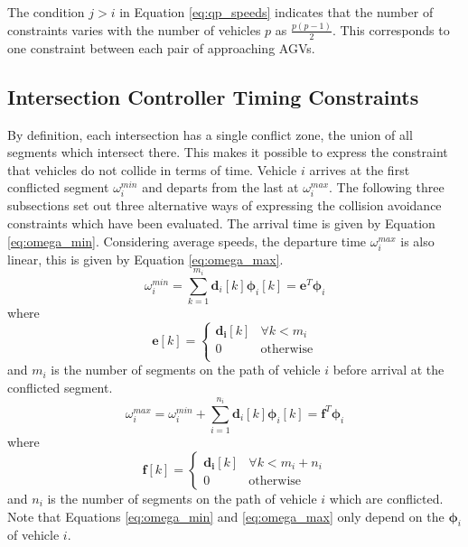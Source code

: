 \documentclass[]{article}
\begin{document}
The condition $j>i$ in Equation \ref{eq:qp_speeds} indicates that the number of constraints varies with the number of vehicles $p$ as $\frac{p(p-1)}{2}$. This corresponds to one constraint between each pair of approaching AGVs.

\subsection{Intersection Controller Timing Constraints}
By definition, each intersection has a single conflict zone, the union of all segments which intersect there. This makes it possible to express the constraint that vehicles do not collide in terms of time. Vehicle $i$ arrives at the first conflicted segment $\omega_i^{min}$ and departs from the last at $\omega_i^{max}$. The following three subsections set out three alternative ways of expressing the collision avoidance constraints which have been evaluated. 
The arrival time is given by Equation \ref{eq:omega_min}. Considering average speeds, the departure time $\omega_i^{max}$ is also linear, this is given by Equation \ref{eq:omega_max}. 
\begin{equation}
	\omega_i^{min}  = \sum_{k=1}^{m_i} \bm{d}_i [k] \bm{\phi}_i [k] = \bm{e}^T \bm{\phi}_i
	\label{eq:omega_min}
\end{equation}
where %
\begin{equation}
	\bm{e}[k] = \left\{
	\begin{array}{cc}
		\bm{d_i}[k] & \forall k <m_i \\
		0 & \textrm{otherwise} \\
	\end{array}
	\right.
\end{equation}  and $m_i$ is the number of segments on the path of vehicle $i$ before arrival at the conflicted segment. 
\begin{equation}
	\omega_i^{max}  = \omega_i^{min} + \sum_{i=1}^{n_i} \bm{d}_i [k] \bm{\phi}_i [k] = \bm{f}^T \bm{\phi}_i
	\label{eq:omega_max}
\end{equation}
where 
\begin{equation}
	\bm{f}[k] = \left\{
	\begin{array}{cc}
		\bm{d_i}[k] & \forall k <m_i+n_i \\
		0 & \textrm{otherwise} 
	\end{array}
	\right.
\end{equation}
and $n_i$ is the number of segments on the path of vehicle $i$ which are conflicted. Note that Equations \ref{eq:omega_min} and \ref{eq:omega_max} only depend on the $\bm{\phi}_i$ of vehicle $i$. 
\end{document}
